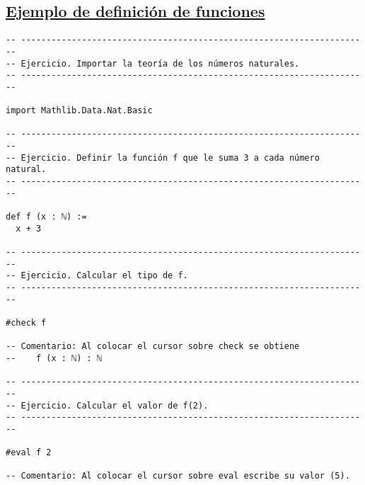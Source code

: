 \subsection{\href{./src/Introduccion/Ejemplo\_de\_definicion\_de\_funciones.lean}{Ejemplo de definición de funciones}}
\label{sec:org59c07b5}
\begin{verbatim}
-- ---------------------------------------------------------------------
-- Ejercicio. Importar la teoría de los números naturales.
-- ---------------------------------------------------------------------

import Mathlib.Data.Nat.Basic

-- ---------------------------------------------------------------------
-- Ejercicio. Definir la función f que le suma 3 a cada número natural.
-- ---------------------------------------------------------------------

def f (x : ℕ) :=
  x + 3

-- ---------------------------------------------------------------------
-- Ejercicio. Calcular el tipo de f.
-- ---------------------------------------------------------------------

#check f

-- Comentario: Al colocar el cursor sobre check se obtiene
--    f (x : ℕ) : ℕ

-- ---------------------------------------------------------------------
-- Ejercicio. Calcular el valor de f(2).
-- ---------------------------------------------------------------------

#eval f 2

-- Comentario: Al colocar el cursor sobre eval escribe su valor (5).
\end{verbatim}

